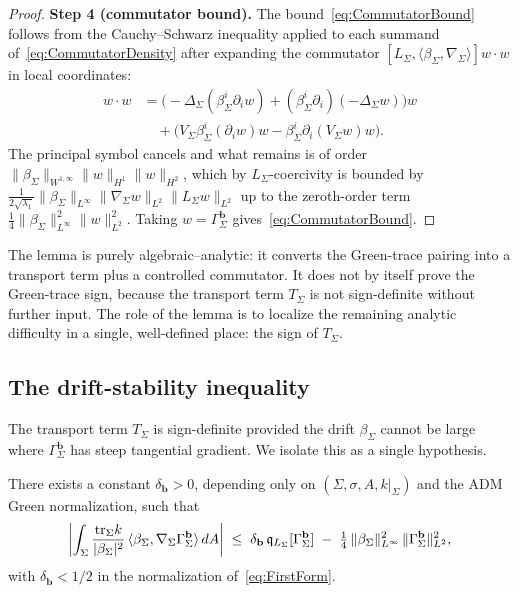 \begin{proof}
\textbf{Step 4 (commutator bound).}
The bound~\eqref{eq:CommutatorBound} follows from the Cauchy--Schwarz inequality applied to each summand of~\eqref{eq:CommutatorDensity} after expanding the commutator $[L_\Sigma,\langle\beta_\Sigma,\nabla_\Sigma\rangle]w\cdot w$ in local coordinates:
\begin{align*}
    [L_\Sigma,\langle\beta_\Sigma,\nabla_\Sigma\rangle]w\cdot w
    &=\bigl(-\Delta_\Sigma(\beta_\Sigma^i\partial_i w)+(\beta_\Sigma^i\partial_i)(-\Delta_\Sigma w)\bigr)w \\
    &\quad+\bigl(V_\Sigma\beta_\Sigma^i(\partial_i w)w-\beta_\Sigma^i\partial_i(V_\Sigma w)w\bigr) .
\end{align*}
The principal symbol cancels and what remains is of order $\|\beta_\Sigma\|_{W^{1,\infty}}\|w\|_{H^1}\|w\|_{H^2}$, which by $L_\Sigma$-coercivity is bounded by $\tfrac{1}{2\sqrt{\lambda_1}}\|\beta_\Sigma\|_{L^\infty}\|\nabla_\Sigma w\|_{L^2}\|L_\Sigma w\|_{L^2}$ up to the zeroth-order term $\tfrac14\|\beta_\Sigma\|_{L^\infty}^2\|w\|_{L^2}^2$. Taking $w=\Gamma_\Sigma^{\mathbf b}$ gives~\eqref{eq:CommutatorBound}.
\end{proof}

\begin{remark}
The lemma is purely algebraic--analytic: it converts the Green-trace pairing into a transport term plus a controlled commutator. It does not by itself prove the Green-trace sign, because the transport term $T_\Sigma$ is not sign-definite without further input. The role of the lemma is to localize the remaining analytic difficulty in a single, well-defined place: the sign of $T_\Sigma$.
\end{remark}

\subsection{The drift-stability inequality}

The transport term $T_\Sigma$ is sign-definite provided the drift $\beta_\Sigma$ cannot be large where $\Gamma_\Sigma^{\mathbf b}$ has steep tangential gradient. We isolate this as a single hypothesis.

\begin{hypothesis}\label{hyp:DriftStability}
There exists a constant $\delta_{\mathbf b}>0$, depending only on $(\Sigma,\sigma,A,k|_\Sigma)$ and the ADM Green normalization, such that
\begin{equation}\label{eq:DriftStability}
    \biggl|\int_\Sigma\frac{\mathrm{tr}_\Sigma k}{|\beta_\Sigma|^2}\,\langle\beta_\Sigma,\nabla_\Sigma\Gamma_\Sigma^{\mathbf b}\rangle\,dA\biggr|
    \;\le\;
    \delta_{\mathbf b}\,\mathfrak q_{L_\Sigma}[\Gamma_\Sigma^{\mathbf b}]
    \;-\;\tfrac14\,\|\beta_\Sigma\|_{L^\infty}^2\,\|\Gamma_\Sigma^{\mathbf b}\|_{L^2}^2 ,
\end{equation}
with $\delta_{\mathbf b}<1/2$ in the normalization of~\eqref{eq:FirstForm}.
\end{hypothesis}

